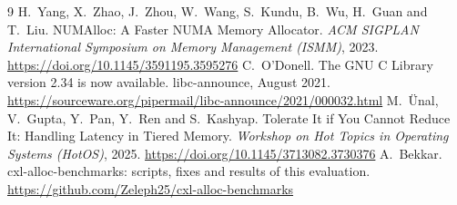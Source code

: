 \documentclass[11pt,a4paper]{article}
\begin{document}
\begin{thebibliography}{9}
 H.~Yang, X.~Zhao, J.~Zhou, W.~Wang, S.~Kundu, B.~Wu, H.~Guan and T.~Liu. NUMAlloc: A Faster NUMA Memory Allocator. \emph{ACM SIGPLAN International Symposium on Memory Management (ISMM)}, 2023. \url{https://doi.org/10.1145/3591195.3595276}
 C.~O'Donell. The GNU C Library version 2.34 is now available. libc-announce, August 2021. \url{https://sourceware.org/pipermail/libc-announce/2021/000032.html}
 M.~\"Unal, V.~Gupta, Y.~Pan, Y.~Ren and S.~Kashyap. Tolerate It if You Cannot Reduce It: Handling Latency in Tiered Memory. \emph{Workshop on Hot Topics in Operating Systems (HotOS)}, 2025. \url{https://doi.org/10.1145/3713082.3730376}
 A.~Bekkar. cxl-alloc-benchmarks: scripts, fixes and results of this evaluation. \url{https://github.com/Zeleph25/cxl-alloc-benchmarks}
\end{thebibliography}
\end{document}
